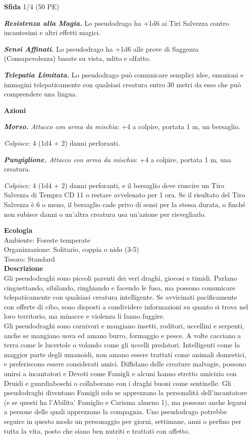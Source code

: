 \begin{multicols}{2}
\textbf{Sfida} 1/4 (50 PE)

\emph{\textbf{Resistenza alla Magia.}} Lo pseudodrago ha +1d6 ai Tiri Salvezza contro incantesimi e altri effetti magici.

\emph{\textbf{Sensi Affinati.}} Lo pseudodrago ha +1d6 alle prove di Saggezza (Consapevolezza) basate su vista, udito e olfatto.

\emph{\textbf{Telepatia Limitata.}} Lo pseudodrago può comunicare semplici idee, emozioni e immagini telepaticamente con qualsiasi creatura entro 30 metri da esso che può comprendere una lingua.

\textbf{Azioni}

\emph{\textbf{Morso.} Attacco con arma da mischia}: +4 a colpire, portata 1 m, un bersaglio.

\emph{Colpisce:} 4 (1d4 + 2) danni perforanti.

\emph{\textbf{Pungiglione.} Attacco con arma da mischia}: +4 a colpire, portata 1 m, una creatura.

\emph{Colpisce:} 4 (1d4 + 2) danni perforanti, e il bersaglio deve riuscire un Tiro Salvezza di Tempra CD 11 o restare avvelenato per 1 ora. Se il risultato del Tiro Salvezza è 6 o meno, il bersaglio cade privo di sensi per la stessa durata, o finché non subisce danni o un'altra creatura usa un'azione per risvegliarlo.

\textbf{Ecologia}\\
Ambiente: Foreste temperate\\
Organizzazione: Solitario, coppia o nido (3-5)\\
Tesoro: Standard\\
\textbf{Descrizione}\\
Gli pseudodraghi sono piccoli parenti dei veri draghi, giocosi e timidi. Parlano cinguettando, sibilando, ringhiando e facendo le fusa, ma possono comunicare telepaticamente con qualsiasi creatura intelligente. Se avvicinati pacificamente con offerte di cibo, sono disposti a condividere informazioni su quanto si trova nel loro territorio, ma minacce e violenza li fanno fuggire.\\

Gli pseudodraghi sono carnivori e mangiano insetti, roditori, uccellini e serpenti, anche se mangiano uova ed amano burro, formaggio e pesce. A volte cacciano a terra come le lucertole o volando come gli uccelli predatori. Intelligenti come la maggior parte degli umanoidi, non amano essere trattati come animali domestici, e preferiscono essere considerati amici. Diffidano delle creature malvagie, possono unirsi a incantatori e Devoti come Famigli e alcuni hanno stretto amicizia con Druidi e guardiaboschi o collaborano con i draghi buoni come sentinelle. Gli pseudodraghi diventano Famigli solo se apprezzano la personalità dell'incantatore (e se questi ha l'Abilita' Famiglio e Carisma almeno 1), ma possono anche legarsi a persone delle quali apprezzano la compagnia. Uno pseudodrago potrebbe seguire in questo modo un personaggio per giorni, settimane, anni o perfino per tutta la vita, posto che siano ben nutriti e trattati con affetto.\\


\end{multicols}
